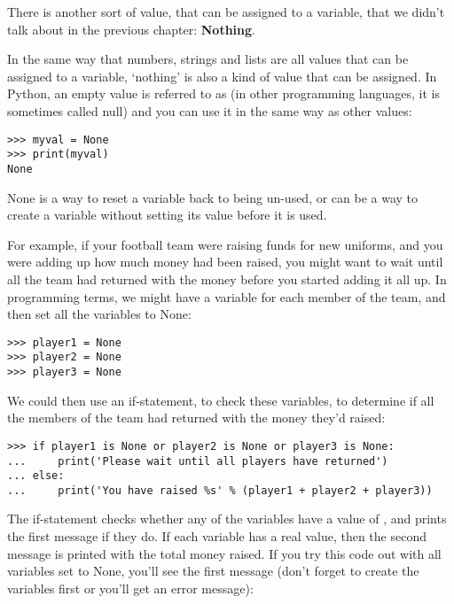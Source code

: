 There is another sort of value, that can be assigned to a variable, that we didn't talk about in the previous chapter:  \textbf{Nothing}.
\par
In the same way that numbers, strings and lists are all values that can be assigned to a variable, `nothing' is also a kind of value that can be assigned.  In Python, an empty value is referred to as  (in other programming languages, it is sometimes called null) and you can use it in the same way as other values:

\begin{listing}
\begin{verbatim}
>>> myval = None
>>> print(myval)
None
\end{verbatim}
\end{listing}

None is a way to reset a variable back to being un-used, or can be a way to create a variable without setting its value before it is used.
\par
For example, if your football team were raising funds for new uniforms, and you were adding up how much money had been raised, you might want to wait until all the team had returned with the money before you started adding it all up.  In programming terms, we might have a variable for each member of the team, and then set all the variables to None:

\begin{listing}
\begin{verbatim}
>>> player1 = None
>>> player2 = None
>>> player3 = None
\end{verbatim}
\end{listing}

We could then use an if-statement, to check these variables, to determine if all the members of the team had returned with the money they'd raised:

\begin{listing}
\begin{verbatim}
>>> if player1 is None or player2 is None or player3 is None:
...     print('Please wait until all players have returned')
... else:
...     print('You have raised %s' % (player1 + player2 + player3))
\end{verbatim}
\end{listing}

The if-statement checks whether any of the variables have a value of , and prints the first message if they do.  If each variable has a real value, then the second message is printed with the total money raised. If you try this code out with all variables set to None, you'll see the first message (don't forget to create the variables first or you'll get an error message):

